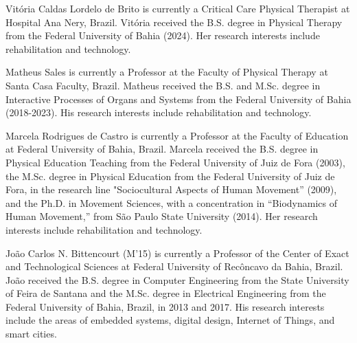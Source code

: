 \documentclass{ieeeaccess}
\begin{document}
{%
\begin{IEEEbiographynophoto}{Vit\'oria Caldas Lordelo de Brito}
is currently a Critical Care Physical Therapist at Hospital Ana Nery, Brazil. Vitória received the B.S. degree in Physical Therapy from the Federal University of Bahia (2024). Her research interests include rehabilitation and technology.
\end{IEEEbiographynophoto}

\begin{IEEEbiographynophoto}{Matheus Sales}
is currently a Professor at the Faculty of Physical Therapy at Santa Casa Faculty, Brazil. Matheus received the B.S. and M.Sc. degree in Interactive Processes of Organs and Systems from the Federal University of Bahia (2018-2023). His research interests include rehabilitation and technology.
\end{IEEEbiographynophoto}

\begin{IEEEbiographynophoto}{Marcela Rodrigues de Castro}
is currently a Professor at the Faculty of Education at Federal University of Bahia, Brazil. Marcela received the B.S. degree in Physical Education Teaching from the Federal University of Juiz de Fora (2003), the M.Sc. degree in Physical Education from the Federal University of Juiz de Fora, in the research line "Sociocultural Aspects of Human Movement” (2009), and the Ph.D. in Movement Sciences, with a concentration in “Biodynamics of Human Movement,” from São Paulo State University (2014). Her research interests include rehabilitation and technology.
\end{IEEEbiographynophoto}

\begin{IEEEbiographynophoto}{Jo\~ao Carlos N. Bittencourt}
(M'15) is currently a Professor of the Center of Exact and Technological Sciences at Federal University of Recôncavo da Bahia, Brazil. João received the B.S. degree in Computer Engineering from the State University of Feira de Santana and the M.Sc. degree in Electrical Engineering from the Federal University of Bahia, Brazil, in 2013 and 2017. His research interests include the areas of embedded systems, digital design, Internet of Things, and smart cities.
\end{IEEEbiographynophoto}

}
\end{document}
